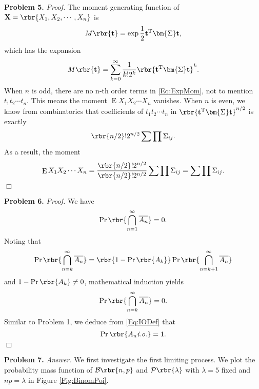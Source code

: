 \documentclass[english, nochinese]{pnote}
\DeclareMathOperator\oppr{\mathrm{Pr}}
\DeclareMathOperator\ope{\mathrm{E}}
\begin{document}
\textbf{Problem 5.} \textit{Proof.} The moment generating function of $ \mathbf{X} = \rbr{ X_1, X_2, \cdots, X_n } $ is
\begin{equation}
M \rbr{\mathbf{t}} = \exp \frac{1}{2} \mathbf{t}^{\text{T}} \bm{\Sigma} \mathbf{t},
\end{equation}
which has the expansion
\begin{equation} \label{Eq:ExpMom}
M \rbr{\mathbf{t}} = \sum_{ k = 0 }^{\infty} \frac{1}{ k ! 2^k } \rbr{ \mathbf{t}^{\text{T}} \bm{\Sigma} \mathbf{t} }^k.
\end{equation}
When $n$ is odd, there are no n-th order terms in \eqref{Eq:ExpMom}, not to mention $ t_1 t_2 \cdots t_n $. This means the moment $ \ope X_1 X_2 \cdots X_n $ vanishes. When $n$ is even, we know from combinatorics that coefficients of $ t_1 t_2 \cdots t_n $ in $ \rbr{ \mathbf{t}^{\text{T}} \bm{\Sigma} \mathbf{t} }^{ n / 2 } $ is exactly
\begin{equation}
\rbr{ n / 2 } ! 2^{ n / 2 } \sum \prod \Sigma_{ i j }.
\end{equation}
As a result, the moment
\begin{equation}
\ope X_1 X_2 \cdots X_n = \frac{ \rbr{ n / 2 } ! 2^{ n / 2 } }{ \rbr{ n / 2 } ! 2^{ n / 2 }} \sum \prod \Sigma_{ i j } = \sum \prod \Sigma_{ i j }.
\end{equation}
\hfill$\Box$

\textbf{Problem 6.} \textit{Proof.} We have
\begin{equation}
\oppr \rbr{ \bigcap_{ n = 1 }^{\infty} \overline{A_n} } = 0.
\end{equation}
Noting that
\begin{equation}
\oppr \rbr{ \bigcap_{ n = k }^{\infty} \overline{A_n} } = \rbr{ 1 - \oppr \rbr{A_k} } \oppr \rbr{ \bigcap_{ n = k + 1 }^{\infty} \overline{A_n} }
\end{equation}
and $ 1 - \oppr \rbr{A_k} \neq 0 $, mathematical induction yields
\begin{equation}
\oppr \rbr{ \bigcap_{ n = k }^{\infty} \overline{A_n} } = 0.
\end{equation}
Similar to Problem 1, we deduce from \eqref{Eq:IODef} that
\begin{equation}
\oppr \rbr{ A_n \textit{i.o.} } = 1.
\end{equation}
\hfill$\Box$

\textbf{Problem 7.} \textit{Answer.} We first investigate the first limiting process. We plot the probability mass function of $ \mathcal{B} \rbr{ n, p } $ and $ \mathcal{P} \rbr{\lambda} $ with $ \lambda = 5 $ fixed and $ n p = \lambda $ in Figure \ref{Fig:BinomPoi}.
\end{document}

